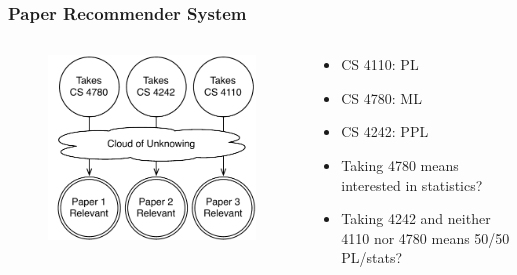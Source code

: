 \documentclass[usenames,dvipsnames]{beamer}
\begin{document}
\begin{frame}
  \frametitle{Paper Recommender System\footnotemark}
  \begin{columns}
    \begin{column}{.48\textwidth}
      \begin{figure}[ht]
        \centering
        \includegraphics[width=1.0\textwidth,keepaspectratio]{figures/ex-problem.pdf}
        \caption*{\label{fig:ex-problem}}
      \end{figure}
    \end{column}
    \begin{column}{.48\textwidth}
      \begin{itemize}
        \item CS 4110: PL
        \item CS 4780: ML
        \item CS 4242: PPL
        \item Taking 4780 means interested in statistics?
        \item Taking 4242 and neither 4110 nor 4780 means 50/50 PL/stats?
      \end{itemize}
    \end{column}
  \end{columns}
\end{frame}
\end{document}
